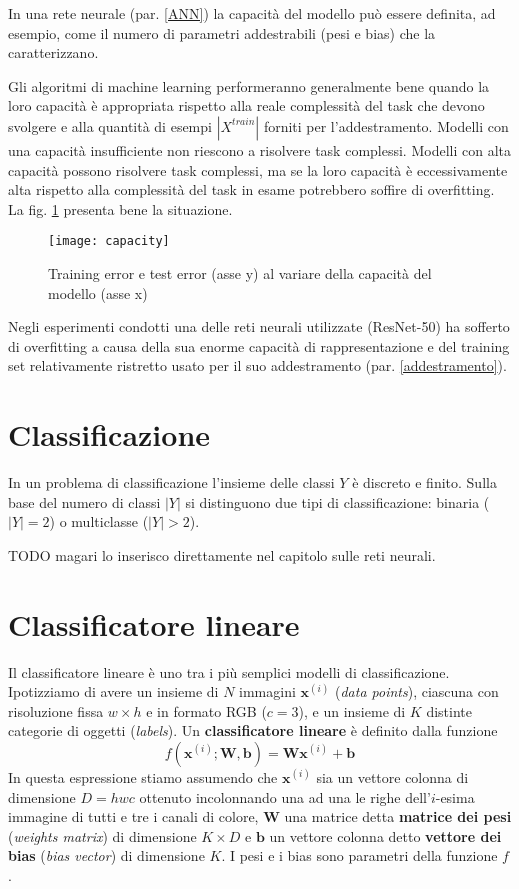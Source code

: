 In una rete neurale (par. \ref{ANN}) la capacità del modello può essere definita, ad esempio, come il numero di parametri addestrabili (pesi e bias) che la caratterizzano.

Gli algoritmi di machine learning performeranno generalmente bene quando la loro capacità è appropriata rispetto alla reale complessità del task che devono svolgere e alla quantità di esempi $|X^{train}|$ forniti per l'addestramento. Modelli con una capacità insufficiente non riescono a risolvere task complessi. Modelli con alta capacità possono risolvere task complessi, ma se la loro capacità è eccessivamente alta rispetto alla complessità del task in esame potrebbero soffire di overfitting. La fig. \ref{fig:capacity} presenta bene la situazione.

\begin{figure}[h]
\centering
\texttt{[image: capacity]}
\caption{Training error e test error (asse y) al variare della capacità del modello (asse x)}
\label{fig:capacity}
\end{figure}

Negli esperimenti condotti una delle reti neurali utilizzate (ResNet-50) ha sofferto di overfitting a causa della sua enorme capacità di rappresentazione e del training set relativamente ristretto usato per il suo addestramento (par. \ref{addestramento}).

\section{Classificazione}
In un problema di classificazione l’insieme delle classi $Y$ è discreto e finito.
Sulla base del numero di classi $|Y|$ si distinguono due tipi di classificazione: binaria ($|Y|=2$) o multiclasse ($|Y|>2$).

TODO magari lo inserisco direttamente nel capitolo sulle reti neurali.








\section{Classificatore lineare}
Il classificatore lineare è uno tra i più semplici modelli di classificazione.
Ipotizziamo di avere un insieme di $N$ immagini $\mathbf{x}^{(i)}$ (\textit{data points}), ciascuna con risoluzione fissa $w\times h$ e in formato RGB ($c=3$), e un insieme di $K$ distinte categorie di oggetti  (\textit{labels}). Un \textbf{classificatore lineare} è definito dalla funzione
\begin{equation} \label{eq_class_lin}
f(\mathbf{x}^{(i)};\mathbf{W},\mathbf{b})=\mathbf{W}\mathbf{x}^{(i)}+\mathbf{b}
\end{equation}
In questa espressione stiamo assumendo che $\mathbf{x}^{(i)}$ sia un vettore colonna di dimensione $D=hwc$ ottenuto incolonnando una ad una le righe dell'$i$-esima immagine di tutti e tre i canali di colore, $\mathbf{W}$ una matrice detta \textbf{matrice dei pesi} (\textit{weights matrix}) di dimensione $K\times D$ e $\mathbf{b}$ un vettore colonna detto \textbf{vettore dei bias} (\textit{bias vector}) di dimensione $K$. I pesi e i bias sono parametri della funzione $f$.

